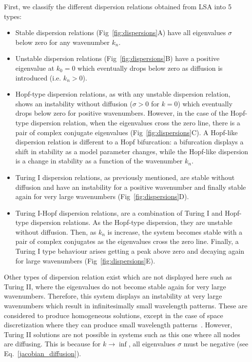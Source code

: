 First, we classify the different dispersion relations obtained from LSA into 5 types:
\begin{itemize}
    \item Stable dispersion relations (Fig~\ref{fig:dispersions}A) have all eigenvalues $\sigma$ below zero for any wavenumber $k_{n}$.
    \item Unstable dispersion relations (Fig~\ref{fig:dispersions}B) have a positive eigenvalue at $k_{0}=0$ which eventually drops below zero as diffusion is introduced (i.e. $k_{n}>0$).
    \item Hopf-type dispersion relations, as with any unstable dispersion relation, shows an instability without diffusion ($\sigma>0$ for $k=0$) which eventually drops below zero for positive wavenumbers.
However, in the case of the Hopf-type dispersion relation, when the eigenvalues cross the zero line, there is a pair of complex conjugate eigenvalues (Fig~\ref{fig:dispersions}C).
A Hopf-like dispersion relation is different to a Hopf bifurcation: a bifurcation displays a shift in stability as a model parameter changes, while the Hopf-like dispersion is a change in stability as a function of the wavenumber $k_{n}$.
\item Turing I dispersion relations, as previously mentioned, are stable without diffusion and have an instability for a positive wavenumber and finally stable again for very large wavenumbers (Fig~\ref{fig:dispersions}D).
    \item Turing I-Hopf dispersion relations, are a combination of Turing I and Hopf-type dispersion relations.
As the Hopf-type dispersion, they are unstable without diffusion.
Then, as $k_{n}$ is increase, the system becomes stable with a pair of complex conjugates as the eigenvalues cross the zero line.
Finally, a Turing I type behaviour arises getting a peak above zero and decaying again for large wavenumbers (Fig~\ref{fig:dispersions}E).
\end{itemize}
Other types of dispersion relation exist which are not displayed here such as Turing II, where the eigenvalues do not become stable again for very large wavenumbers.
Therefore, this system displays an instability at very large wavenumbers which result in infinitesimally small wavelength patterns.
These are considered to produce homogeneous solutions, except in the case of space discretization where they can produce small wavelength patterns~\parencite{Wang2022}.
However, Turing II solutions are not possible in systems such as this one where all nodes are diffusing.
This is because for $k \rightarrow \inf$, all eigenvalues $\sigma$ must be negative (see Eq.~\ref{jacobian_diffusion}).


